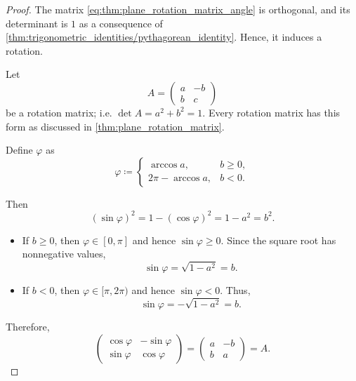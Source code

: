 \begin{proof}
   The matrix \eqref{eq:thm:plane_rotation_matrix_angle} is orthogonal, and its determinant is \( 1 \) as a consequence of \cref{thm:trigonometric_identities/pythagorean_identity}. Hence, it induces a rotation.

   Let
  \begin{equation*}
    A
    =
    \begin{pmatrix}
      a & -b \\
      b & c
    \end{pmatrix}
  \end{equation*}
  be a rotation matrix; i.e. \( \det A = a^2 + b^2 = 1 \). Every rotation matrix has this form as discussed in \cref{thm:plane_rotation_matrix}.

  Define \( \varphi \) as
  \begin{equation*}
    \varphi \coloneqq \begin{cases}
      \arccos a,         &b \geq 0, \\
      2 \pi - \arccos a, &b < 0.
    \end{cases}
  \end{equation*}

  Then
  \begin{equation*}
    (\sin \varphi)^2 = 1 - (\cos \varphi)^2 = 1 - a^2 = b^2.
  \end{equation*}

  \begin{itemize}
    \item If \( b \geq 0 \), then \( \varphi \in [0, \pi] \) and hence \( \sin \varphi \geq 0 \). Since the square root has nonnegative values,
    \begin{equation*}
      \sin \varphi = \sqrt{ 1 - a^2 } = b.
    \end{equation*}

    \item If \( b < 0 \), then \( \varphi \in [\pi, 2\pi) \) and hence \( \sin \varphi < 0 \). Thus,
    \begin{equation*}
      \sin \varphi = -\sqrt{ 1 - a^2 } = b.
    \end{equation*}
  \end{itemize}

  Therefore,
  \begin{equation*}
    \begin{pmatrix}
      \cos \varphi & -\sin \varphi \\
      \sin \varphi & \cos \varphi
    \end{pmatrix}
    =
    \begin{pmatrix}
      a & -b \\
      b & a
    \end{pmatrix}
    =
    A.
  \end{equation*}


\end{proof}
